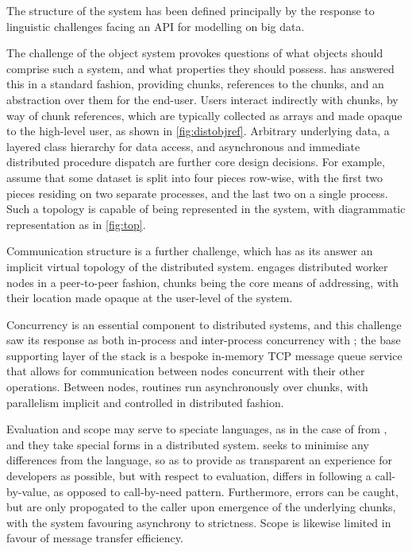 The structure of the \lsr system has been defined principally by the response to linguistic challenges facing an API for modelling on big data.

The challenge of the object system provokes questions of what objects should comprise such a system, and what properties they should possess.
\lsr has answered this in a standard fashion, providing chunks, references to the chunks, and an abstraction over them for the end-user. Users interact indirectly with chunks, by way of chunk references, which are typically collected as arrays and made opaque to the high-level user, as shown in \cref{fig:distobjref}. Arbitrary underlying data, a layered class hierarchy for data access, and asynchronous and immediate distributed procedure dispatch are further core design decisions.
For example, assume that some dataset is split into four pieces row-wise, with the first two pieces residing on two separate processes, and the last two on a single process.
Such a topology is capable of being represented in the \lsr system, with diagrammatic representation as in \cref{fig:top}.



Communication structure is a further challenge, which has as its answer an implicit virtual topology of the distributed system.
\lsr engages distributed worker nodes in a peer-to-peer fashion, chunks being the core means of addressing, with their location made opaque at the user-level of the system.

Concurrency is an essential component to distributed systems, and this challenge saw its response as both in-process and inter-process concurrency with \lsr; the base supporting layer of the \lsr stack is a bespoke in-memory TCP message queue service that allows for communication between nodes concurrent with their other operations.
Between nodes, routines run asynchronously over chunks, with parallelism implicit and controlled in distributed fashion.

Evaluation and scope may serve to speciate languages, as in the case of \R from , and they take special forms in a distributed system.
\lsr seeks to minimise any differences from the \R language, so as to provide as transparent an experience for developers as possible, but with respect to evaluation, differs in following a call-by-value, as opposed to call-by-need pattern. Furthermore, errors can be caught, but are only propogated to the caller upon emergence of the underlying chunks, with the system favouring asynchrony to strictness. Scope is likewise limited in favour of message transfer efficiency.

